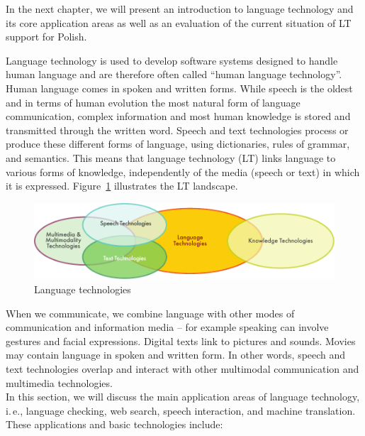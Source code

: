 \begin{multicols}{2}
In the next chapter, we will present an introduction to language
technology and its core application areas as well as an evaluation of
the current situation of LT support for Polish. 

\end{multicols} 

\clearpage 


\begin{multicols}{2} 

Language technology is used to develop software systems designed to
handle human language and are therefore often called “human language
technology”. Human language comes in spoken and written forms. While
speech is the oldest and in terms of human evolution the most natural
form of language communication, complex information and most human
knowledge is stored and transmitted through the written word. Speech
and text technologies process or produce these different forms of
language, using dictionaries, rules of grammar, and semantics. This
means that language technology (LT) links language to various forms of
knowledge, independently of the media (speech or text) in which it is
expressed. Figure~\ref{fig:ltincontext_en} illustrates the LT
landscape. 

\begin{figure}[htb]  \center
\includegraphics[width=\textwidth]{../_media/english/language_technologies}
\caption{Language technologies} \label{fig:ltincontext_en}
 \end{figure} 

When we communicate, we combine language with other modes of
communication and information media -- for example speaking can
involve gestures and facial expressions. Digital texts link to
pictures and sounds. Movies may contain language in spoken and written
form. In other words, speech and text technologies overlap and
interact with other multimodal communication and multimedia
technologies.\\
In this section, we will discuss the main application areas of
language technology, i.\,e., language checking, web search, speech
interaction, and machine translation. These applications and basic
technologies include: 


\end{multicols}
